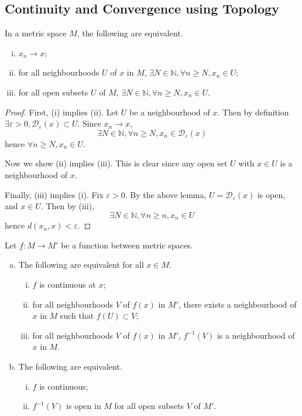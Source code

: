 \subsection{Continuity and Convergence using Topology}
\begin{proposition}
	In a metric space \( M \), the following are equivalent.
	\begin{enumerate}[(i)]
		\item \( x_n \to x \);
		\item for all neighbourhoods \( U \) of \( x \) in \( M \), \( \exists N \in \mathbb N, \forall n \geq N, x_n \in U \);
		\item for all open subsets \( U \) of \( M \), \( \exists N \in \mathbb N, \forall n \geq N, x_n \in U \).
	\end{enumerate}
\end{proposition}
\begin{proof}
	First, (i) implies (ii).
	Let \( U \) be a neighbourhood of \( x \).
	Then by definition \( \exists \varepsilon > 0, \mathcal D_\varepsilon(x) \subset U \).
	Since \( x_n \to x \),
	\[
		\exists N \in \mathbb N, \forall n \geq N, x_n \in \mathcal D_\varepsilon(x)
	\]
	hence \( \forall n \geq N, x_n \in U \).

	Now we show (ii) implies (iii).
	This is clear since any open set \( U \) with \( x \in U \) is a neighbourhood of \( x \).

	Finally, (iii) implies (i).
	Fix \( \varepsilon > 0 \).
	By the above lemma, \( U = \mathcal D_\varepsilon(x) \) is open, and \( x \in U \).
	Then by (iii),
	\[
		\exists N \in \mathbb N, \forall n \geq n, x_n \in U
	\]
	hence \( d(x_n, x) < \varepsilon \).
\end{proof}
\begin{proposition}
	Let \( f \colon M \to M' \) be a function between metric spaces.
	\begin{enumerate}[(a)]
		\item The following are equivalent for all \( x \in M \).
		      \begin{enumerate}[(i)]
			      \item \( f \) is continuous at \( x \);
			      \item for all neighbourhoods \( V \) of \( f(x) \) in \( M' \), there exists a neighbourhood of \( x \) in \( M \) such that \( f(U) \subset V \);
			      \item for all neighbourhoods \( V \) of \( f(x) \) in \( M' \), \( f^{-1}(V) \) is a neighbourhood of \( x \) in \( M \).
		      \end{enumerate}
		\item The following are equivalent.
		      \begin{enumerate}[(i)]
			      \item \( f \) is continuous;
			      \item \( f^{-1}(V) \) is open in \( M \) for all open subsets \( V \) of \( M' \).
		      \end{enumerate}
	\end{enumerate}
\end{proposition}
